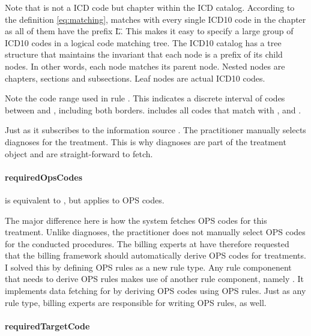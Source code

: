 Note that  is not a ICD code but chapter within the ICD catalog.
According to the definition \ref{eq:matching},  matches with every single ICD10 code in the  chapter as all of them have the prefix \"L\".
This makes it easy to specify a large group of ICD10 codes in a logical code matching tree.
The ICD10 catalog has a tree structure that maintains the invariant that each node is a prefix of its child nodes.
In other words, each node matches its parent node.
Nested nodes are chapters, sections and subsections.
Leaf nodes are actual ICD10 codes.

Note the code range  used in rule .
This indicates a discrete interval of codes between  and , including both borders.
 includes all codes that match with ,  and .

Just as  it subscribes to the information source .
The practitioner manually selects diagnoses for the treatment.
This is why diagnoses are part of the treatment object and are straight-forward to fetch.

\paragraph{requiredOpsCodes}

 is equivalent to , but applies to OPS codes.

The major difference here is how the system fetches OPS codes for this treatment.
Unlike diagnoses, the practitioner does not manually select OPS codes for the conducted procedures.
The billing experts at \AV have therefore requested that the billing framework should automatically derive OPS codes for treatments.
I solved this by defining OPS rules as a new rule type.
Any rule componenent that needs to derive OPS rules makes use of another rule component, namely .
It implements data fetching for  by deriving OPS codes using OPS rules.
Just as any rule type, billing experts are responsible for writing OPS rules, as well.

\paragraph{requiredTargetCode}

